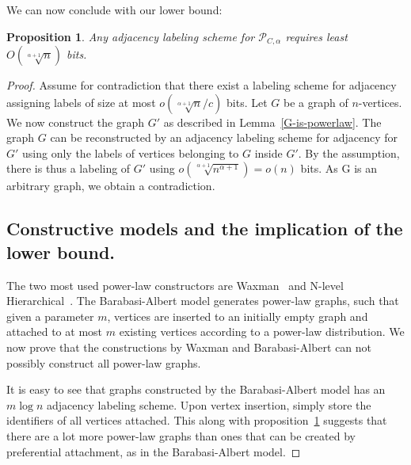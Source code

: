 \documentclass{article}
\newtheorem{proposition}{Proposition}
\theoremstyle{remark}
\begin{document}
We can now conclude with our lower bound:
\begin{proposition}\label{prop:lower-bound-powerlaw}
Any adjacency labeling scheme for  $\mathcal{P}_{C,\alpha}$ requires  least $O(\sqrt[\alpha+1]{n})$ bits.
\end{proposition}

\begin{proof}
Assume for contradiction that there exist a labeling scheme for adjacency assigning labels of size at most $o(\sqrt[\alpha+1]{n}/c)$ bits. 
Let $G$ be a graph of $n$-vertices. 
We now construct the graph $G'$ as described in Lemma~\ref{G-is-powerlaw}.
 The graph $G$ can be reconstructed by an adjacency labeling scheme for adjacency for $G'$ using only the labels of vertices belonging to $G$ inside $G'$. By the assumption, there is thus a labeling of $G'$ using
$o(\sqrt[\alpha+1]{n^{\alpha+1}}) = o(n)$ bits. As G is an  arbitrary graph, we obtain a contradiction.



\subsection{Constructive models and the implication of the lower bound.}
The two most used power-law constructors are Waxman~\cite{} and N-level Hierarchical~\cite{}.
The Barabasi-Albert model generates power-law graphs, such that given a parameter $m$, vertices are inserted to an initially empty graph and attached to at most $m$ existing vertices according to a power-law distribution.
We now prove that  the  constructions  by Waxman and Barabasi-Albert  can not possibly construct all power-law graphs.

It is easy to see that  graphs constructed by the Barabasi-Albert model  has an $m \log n$ adjacency labeling scheme.
Upon vertex insertion, simply store the identifiers of all vertices attached.
  This along with proposition~\ref{prop:lower-bound-powerlaw} suggests that there are  a lot more power-law graphs than ones that can be created by  preferential attachment, as in the Barabasi-Albert model.

\end{proof}



 

\end{document}
